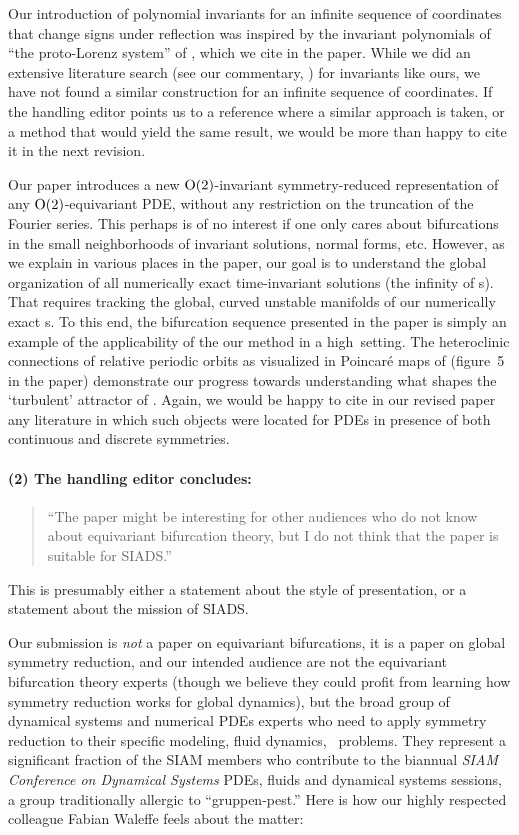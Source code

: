 \documentclass[12pt]{article}
\begin{document}
Our introduction of polynomial invariants for an infinite sequence of
coordinates that change signs under reflection was inspired by
the invariant polynomials of ``the proto-Lorenz system'' of
, which we cite in the paper. While we
did an extensive literature search (see our commentary,
) for invariants like ours, we have
not found a similar construction for an infinite sequence of
coordinates. If the handling editor points us to a reference where a
similar approach is taken, or a method that would yield the
same result, we would be more than happy to cite it in the next revision.

Our paper introduces a new $\textrm{O}(2)$-invariant symmetry-reduced
representation of any
$\textrm{O}(2)$-equivariant PDE, without
any restriction on the truncation of the Fourier series. This
perhaps is of no interest if one only cares about bifurcations
in the small neighborhoods of invariant solutions, normal forms, etc.
However, as we explain in various places in the paper, our goal
is to understand the global organization of all numerically
exact time-invariant solutions (the infinity of \rpo s). That
requires tracking the global, curved unstable manifolds of
our numerically exact \rpo s. To this end, the bifurcation
sequence presented in the paper is simply an example of the
applicability of the our method in a high\dmn\ setting.
The heteroclinic connections of
relative periodic orbits as visualized in Poincar\'e maps of
 (figure~5 in the paper)
demonstrate our progress towards understanding what shapes the `turbulent' attractor
of . Again, we would be
happy to cite in our revised paper any
literature in which such objects were located for
PDEs in presence of both continuous and discrete symmetries.

\paragraph{(2) The handling editor concludes:}

\begin{quote}
``The paper might be interesting for other audiences who do not know
about equivariant bifurcation theory, but I do not think that the paper
is suitable for SIADS.''
\end{quote}

This is presumably either a statement about the style of presentation, or a
statement about the mission of SIADS.


Our submission is \emph{not}
a paper on equivariant bifurcations, it is a paper on global symmetry
reduction, and our intended audience are not the equivariant bifurcation
theory experts (though we believe they could profit from learning how
symmetry reduction works for global dynamics), but the broad group of
dynamical systems and numerical PDEs experts who need to apply symmetry
reduction to their specific modeling, fluid dynamics, \etc\ problems.
They represent a significant fraction of the SIAM members who contribute
to the biannual \emph{SIAM Conference on Dynamical Systems} PDEs, fluids
and dynamical systems sessions, a group traditionally allergic to
``gruppen-pest.'' Here is how our highly respected colleague Fabian
Waleffe feels about the matter:
\end{document}
